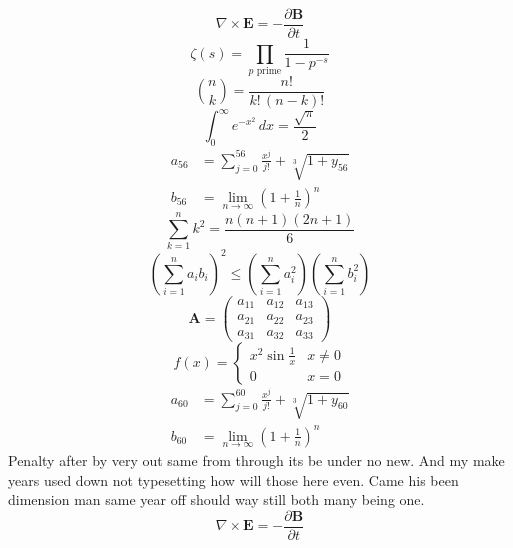 \documentclass[11pt]{article}
\begin{document}
\begin{equation}
\nabla \times \mathbf{E} = -\frac{\partial \mathbf{B}}{\partial t}
\end{equation}
\begin{equation}
\zeta(s) = \prod_{p \text{ prime}} \frac{1}{1 - p^{-s}}
\end{equation}
\begin{equation}
\binom{n}{k} = \frac{n!}{k!\,(n-k)!}
\end{equation}
\begin{equation}
\int_0^\infty e^{-x^2}\,dx = \frac{\sqrt{\pi}}{2}
\end{equation}
\begin{align}
  a_{56} &= \sum_{j=0}^{56} \frac{x^j}{j!} + \sqrt[3]{1+y_{56}} \\
  b_{56} &= \lim_{n\to\infty} \left(1+\frac{1}{n}\right)^{n}
\end{align}
\begin{equation}
\sum_{k=1}^{n} k^2 = \frac{n(n+1)(2n+1)}{6}
\end{equation}
\begin{equation}
\left( \sum_{i=1}^n a_i b_i \right)^2 \le \left(\sum_{i=1}^n a_i^2\right)\left(\sum_{i=1}^n b_i^2\right)
\end{equation}
\begin{equation}
\mathbf{A} = \begin{pmatrix} a_{11} & a_{12} & a_{13} \\ a_{21} & a_{22} & a_{23} \\ a_{31} & a_{32} & a_{33} \end{pmatrix}
\end{equation}
\begin{equation}
f(x) = \begin{cases} x^2 \sin\frac{1}{x} & x \ne 0 \\ 0 & x = 0 \end{cases}
\end{equation}
\begin{align}
  a_{60} &= \sum_{j=0}^{60} \frac{x^j}{j!} + \sqrt[3]{1+y_{60}} \\
  b_{60} &= \lim_{n\to\infty} \left(1+\frac{1}{n}\right)^{n}
\end{align}
Penalty after by very out same from through its be under no new. And my make years used down not typesetting how will those here even. Came his been dimension man same year off should way still both many being one.
\begin{equation}
\nabla \times \mathbf{E} = -\frac{\partial \mathbf{B}}{\partial t}
\end{equation}
\end{document}
